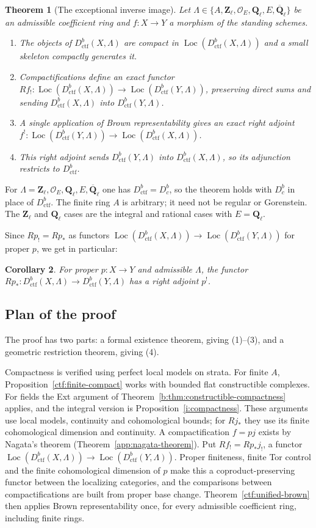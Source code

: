 \documentclass[11pt,a4paper]{article}
\numberwithin{equation}{section}
\newtheorem{theorem}{Theorem}[section]
\newtheorem{corollary}[theorem]{Corollary}
\theoremstyle{definition}
\theoremstyle{remark}
\newcommand{\Dbc}{D^b_c}
\newcommand{\Loc}{\operatorname{Loc}}
\newcommand{\Qbar}{\overline{\mathbf Q}_\ell}
\newcommand{\Ql}{\mathbf Q_\ell}
\newcommand{\Zl}{\mathbf Z_\ell}
\newcommand{\Dctf}{D^b_{\mathrm{ctf}}}
\begin{document}
\begin{theorem}[The exceptional inverse image]
\label{n:existence}
Let $\Lambda\in\{A,\Zl,\mathcal O_E,\Ql,E,\Qbar\}$ be an admissible
coefficient ring and $f:X\to Y$ a morphism of the standing schemes.
\begin{enumerate}
\item The objects of $\Dctf(X,\Lambda)$ are compact in
  $\Loc(\Dctf(X,\Lambda))$ and a small skeleton compactly generates it.
\item Compactifications define an exact functor
  $Rf_!:\Loc(\Dctf(X,\Lambda))\to\Loc(\Dctf(Y,\Lambda))$, preserving
  direct sums and sending $\Dctf(X,\Lambda)$ into $\Dctf(Y,\Lambda)$.
\item A single application of Brown representability gives an exact
  right adjoint $f^!:\Loc(\Dctf(Y,\Lambda))\to\Loc(\Dctf(X,\Lambda))$.
\item This right adjoint sends $\Dctf(Y,\Lambda)$ into
  $\Dctf(X,\Lambda)$, so its adjunction restricts to $\Dctf$.
\end{enumerate}
\end{theorem}
For $\Lambda=\Zl,\mathcal O_E,\Ql,E,\Qbar$ one has $\Dctf=\Dbc$, so
the theorem holds with $\Dbc$ in place of $\Dctf$. The finite ring $A$
is arbitrary; it need not be regular or Gorenstein. The $\Zl$ and
$\Ql$ cases are the integral and rational cases with $E=\Ql$.

Since $Rp_!=Rp_*$ as functors $\Loc(\Dctf(X,\Lambda))\to
\Loc(\Dctf(Y,\Lambda))$ for proper $p$, we get in particular:

\begin{corollary}
\label{n:existence-b}
For proper $p:X\to Y$ and admissible $\Lambda$, the functor
$Rp_*:\Dctf(X,\Lambda)\to\Dctf(Y,\Lambda)$ has a right adjoint $p^!$.
\end{corollary}

\subsection{Plan of the proof}
\label{sec:plan}
The proof has two parts: a formal existence theorem, giving
(1)--(3), and a geometric restriction theorem, giving (4).

Compactness is verified using perfect local models on strata. For
finite $A$, Proposition~\ref{ctf:finite-compact} works with bounded
flat constructible complexes. For fields the Ext argument of
Theorem~\ref{b:thm:constructible-compactness} applies, and the
integral version is Proposition~\ref{i:compactness}. These arguments
use local models, continuity and cohomological bounds; for $Rj_*$ they
use its finite cohomological dimension and continuity.
A compactification $f=pj$ exists by Nagata's theorem
(Theorem~\ref{app:nagata-theorem}). Put $Rf_!=Rp_*j_!$, a functor
$\Loc(\Dctf(X,\Lambda))\to\Loc(\Dctf(Y,\Lambda))$. Proper finiteness,
finite Tor control and the finite cohomological dimension of $p$ make
this a coproduct-preserving functor between the localizing categories,
and the comparisons between compactifications are built from proper
base change. Theorem~\ref{ctf:unified-brown} then applies Brown
representability once, for every admissible coefficient ring,
including finite rings.
\end{document}
